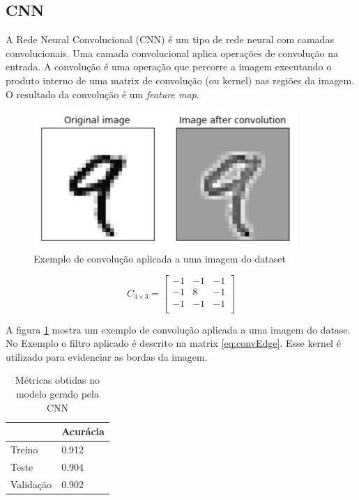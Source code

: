\documentclass[a4paper,10pt]{article}
\begin{document}
\subsection{CNN}

A Rede Neural Convolucional (CNN) é um tipo de rede neural com camadas convolucionais. Uma camada convolucional aplica operações de convolução na entrada. A convolução é uma operação que percorre a imagem executando o produto interno de uma matrix de convolução (ou kernel) nas regiões da imagem. O resultado da convolução é um \textit{feature map}.



\begin{figure}[h!]
        \centering
        \includegraphics[width=10cm]{image_conv.png}
        \caption{Exemplo de convolução aplicada a uma imagem do dataset}
        \label{fig:img_conv}
\end{figure}

\begin{equation}
C_{3\times 3}= 
    \begin{bmatrix}
        -1 &-1 & -1  \\
        -1 &8 & -1  \\
        -1 &-1 & -1  \\
\end{bmatrix}
\label{eq:convEdge}
\end{equation}

A figura \ref{fig:img_conv} mostra um exemplo de convolução aplicada a uma imagem do datase. No Exemplo o filtro aplicado é descrito na matrix \ref{eq:convEdge}. Esse kernel é utilizado para evidenciar as bordas da imagem. 



\begin{table}[h!]
\centering
\begin{tabular}{l||l}

            &   Acurácia    \\ \hline
Treino      &   0.912           \\ \hline
Teste       &   0.904      
\\ \hline
Validação   &   0.902
\end{tabular}
\caption{Métricas obtidas no modelo gerado pela CNN}
  \label{tab:metrica_cnn}
\end{table}
\end{document}
